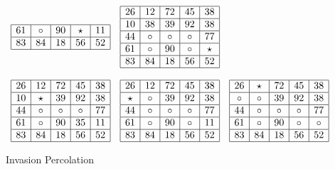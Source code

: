 \begin{figure}
\begin{footnotesize}
\begin{math}
\begin{array}{ccc}
\begin{array}{|c|c|c|c|c|}
\hline
61 & \circ & 90 & \star & 11 \\
\hline
83 & 84 & 18 & 56 & 52 \\
\hline
\end{array}
&
\begin{array}{|c|c|c|c|c|}
\hline
26 & 12 & 72 & 45 & 38 \\
\hline
10 & 38 & 39 & 92 & 38 \\
\hline
44 & \circ & \circ & \circ & 77 \\
\hline
61 & \circ & 90 & \circ & \star \\
\hline
83 & 84 & 18 & 56 & 52 \\
\hline
\end{array}
\\
 & & \\
\begin{array}{|c|c|c|c|c|}
\hline
26 & 12 & 72 & 45 & 38 \\
\hline
10 & \star & 39 & 92 & 38 \\
\hline
44 & \circ & \circ & \circ & 77 \\
\hline
61 & \circ & 90 & 35 & 11 \\
\hline
83 & 84 & 18 & 56 & 52 \\
\hline
\end{array}
&
\begin{array}{|c|c|c|c|c|}
\hline
26 & 12 & 72 & 45 & 38 \\
\hline
\star & \circ & 39 & 92 & 38 \\
\hline
44 & \circ & \circ & \circ & 77 \\
\hline
61 & \circ & 90 & \circ & 11 \\
\hline
83 & 84 & 18 & 56 & 52 \\
\hline
\end{array}
&
\begin{array}{|c|c|c|c|c|}
\hline
26 & \star & 72 & 45 & 38 \\
\hline
\circ & \circ & 39 & 92 & 38 \\
\hline
44 & \circ & \circ & \circ & 77 \\
\hline
61 & \circ & 90 & \circ & \circ \\
\hline
83 & 84 & 18 & 56 & 52 \\
\hline
\end{array}
\end{array}
\end{math}
\end{footnotesize}
\caption{Invasion Percolation\label{f:invperc1}}
\end{figure}

